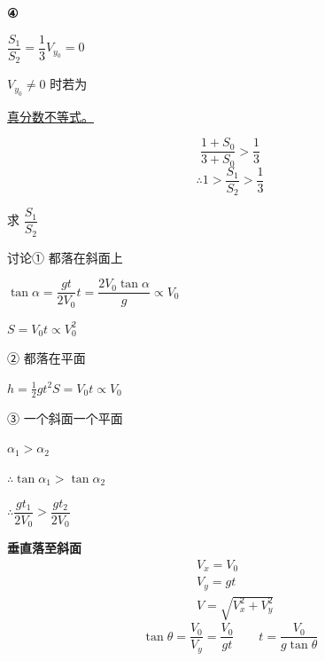 \textbf{④}

\noindent $\dfrac{S_1}{S_2}=\dfrac13$\qquad $V_{y_0}=0$

\noindent $V_{y_0}\neq0$ 时\quad 若为

\noindent \underline{真分数不等式。}%

\[
\frac{1+S_0}{3+S_0}>\frac13
\]
\[
\therefore 1>\frac{S_1}{S_2}>\frac13
\]%

\noindent 求 $\dfrac{S_1}{S_2}$

\noindent 讨论\quad ① 都落在斜面上

\noindent $\tan\alpha=\dfrac{gt}{2V_0}$\qquad $t=\dfrac{2V_0\tan\alpha}{g}\propto V_0$\qquad {}

\noindent $S=V_0t\propto V_0^2$\qquad {}%

\noindent ② 都落在平面

\noindent $h=\tfrac12gt^2$\quad {}\quad $S=V_0t\propto V_0$\quad {}

\noindent ③ 一个斜面一个平面

\noindent $\alpha_1>\alpha_2$

\noindent $\therefore\tan\alpha_1>\tan\alpha_2$

\noindent $\therefore\dfrac{gt_1}{2V_0}>\dfrac{gt_2}{2V_0}$

\noindent {}%

\textbf{垂直落至斜面}
\begin{align*}
&V_x=V_0\\
&V_y=gt\\
&V=\sqrt{V_x^2+V_y^2}
\end{align*}
\[ \tan\theta=\dfrac{V_0}{V_y}=\dfrac{V_0}{gt}\qquad t=\dfrac{V_0}{g\tan\theta} \]

